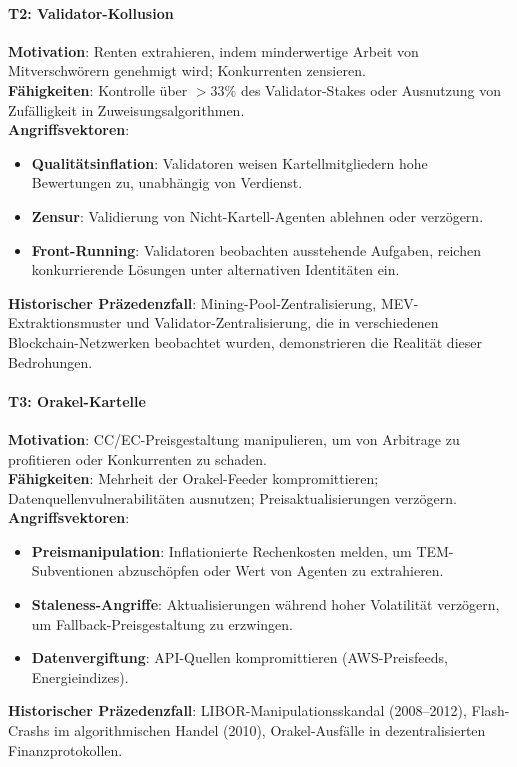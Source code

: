 \documentclass[11pt]{article}
\begin{document}
\paragraph{T2: Validator-Kollusion}
\textbf{Motivation}: Renten extrahieren, indem minderwertige Arbeit von Mitverschwörern genehmigt wird; Konkurrenten zensieren.\\
\textbf{Fähigkeiten}: Kontrolle über $>33\%$ des Validator-Stakes oder Ausnutzung von Zufälligkeit in Zuweisungsalgorithmen.\\
\textbf{Angriffsvektoren}:
\begin{itemize}[noitemsep]
  \item \textbf{Qualitätsinflation}: Validatoren weisen Kartellmitgliedern hohe Bewertungen zu, unabhängig von Verdienst.
  \item \textbf{Zensur}: Validierung von Nicht-Kartell-Agenten ablehnen oder verzögern.
  \item \textbf{Front-Running}: Validatoren beobachten ausstehende Aufgaben, reichen konkurrierende Lösungen unter alternativen Identitäten ein.
\end{itemize}
\textbf{Historischer Präzedenzfall}: Mining-Pool-Zentralisierung, MEV-Extraktionsmuster und Validator-Zentralisierung, die in verschiedenen Blockchain-Netzwerken beobachtet wurden, demonstrieren die Realität dieser Bedrohungen.

\paragraph{T3: Orakel-Kartelle}
\textbf{Motivation}: CC/EC-Preisgestaltung manipulieren, um von Arbitrage zu profitieren oder Konkurrenten zu schaden.\\
\textbf{Fähigkeiten}: Mehrheit der Orakel-Feeder kompromittieren; Datenquellenvulnerabilitäten ausnutzen; Preisaktualisierungen verzögern.\\
\textbf{Angriffsvektoren}:
\begin{itemize}[noitemsep]
  \item \textbf{Preismanipulation}: Inflationierte Rechenkosten melden, um TEM-Subventionen abzuschöpfen oder Wert von Agenten zu extrahieren.
  \item \textbf{Staleness-Angriffe}: Aktualisierungen während hoher Volatilität verzögern, um Fallback-Preisgestaltung zu erzwingen.
  \item \textbf{Datenvergiftung}: API-Quellen kompromittieren (AWS-Preisfeeds, Energieindizes).
\end{itemize}
\textbf{Historischer Präzedenzfall}: LIBOR-Manipulationsskandal (2008--2012), Flash-Crashs im algorithmischen Handel (2010), Orakel-Ausfälle in dezentralisierten Finanzprotokollen.
\end{document}
